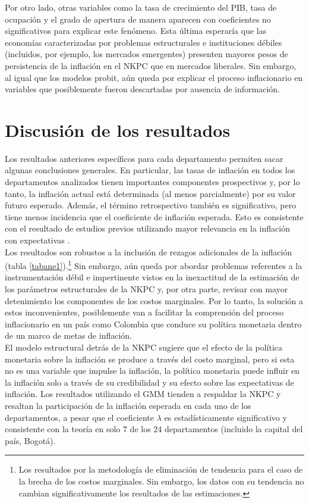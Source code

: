 Por otro lado, otras variables como la tasa de crecimiento del PIB, tasa de ocupación y el grado de apertura de manera aparecen con coeficientes no significativos para explicar este fenómeno. Esta última esperaría que las economías caracterizadas por problemas estructurales e instituciones débiles (incluidos, por ejemplo, los mercados emergentes)  presenten mayores pesos de persistencia de la inflación en el NKPC que en mercados liberales. Sin embargo, al igual que los modelos probit, aún queda por explicar el proceso inflacionario en variables que posiblemente fueron descartadas por ausencia de información. 

\section{Discusión de los resultados}
Los resultados anteriores específicos para cada departamento permiten sacar algunas conclusiones generales. En particular, las tasas de inflación en todos los departamentos analizados tienen importantes componentes prospectivos y, por lo tanto, la inflación actual está determinada (al menos parcialmente) por su valor futuro esperado. Además, el término retrospectivo también es significativo, pero tiene menos incidencia que el coeficiente de inflación esperada. Esto es consistente con el resultado de estudios previos utilizando mayor relevancia en la inflación con expectativas \citep{gali2001european,ramos2008inflation,mehrotra2010modelling,vavsivcek2011inflation}.\\ 

Los resultados son robustos a la inclusión de rezagos adicionales de la inflación (tabla \ref{tabane1}).\footnote {Los resultados por la metodología de eliminación de tendencia para el caso de la brecha de los costos marginales. Sin embargo, los datos con su tendencia no cambian significativamente los resultados de las estimaciones.}  Sin embargo,  aún queda por abordar problemas referentes a la instrumentación débil e impertinente vistos en la inexactitud de la estimación de los parámetros estructurales de la NKPC \citep{ma2002gmm}  y, por otra parte, revisar con mayor detenimiento los componentes de los costos marginales. Por lo tanto,  la  solución a estos inconvenientes, posiblemente van a facilitar la   comprensión  del proceso inflacionario en un país como Colombia que conduce su política monetaria dentro de un marco de metas de inflación. \\

El modelo estructural detrás de la NKPC sugiere que el efecto de la política monetaria sobre la inflación se produce a través del costo marginal, pero si esta no es una variable que impulse la inflación, la política monetaria puede influir en la inflación solo a través de su credibilidad y su efecto sobre las expectativas de inflación. Los resultados utilizando el GMM tienden a respaldar la NKPC  y  resaltan la participación de la inflación esperada en cada uno de los departamentos, a pesar que el coeficiente $\lambda$  es estadísticamente significativo y consistente con la teoría en  solo 7 de los 24 departamentos (incluido la capital del país, Bogotá). \\

